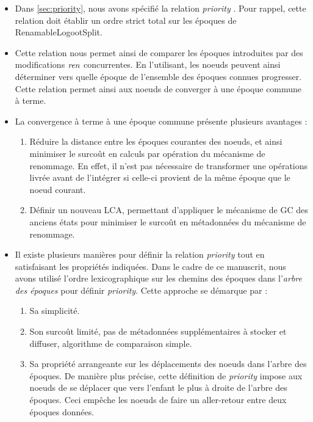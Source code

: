 \begin{itemize}
    \item Dans \autoref{sec:priority}, nous avons spécifié la relation \emph{priority} .
        Pour rappel, cette relation doit établir un ordre strict total sur les époques de RenamableLogootSplit.
    \item Cette relation nous permet ainsi de comparer les époques introduites par des modifications $\mathit{ren}$ concurrentes.
        En l'utilisant, les noeuds peuvent ainsi déterminer vers quelle époque de l'ensemble des époques connues progresser.
        Cette relation permet ainsi aux noeuds de converger à une époque commune à terme.
    \item La convergence à terme à une époque commune présente plusieurs avantages :
        \begin{enumerate}
            \item Réduire la distance entre les époques courantes des noeuds, et ainsi minimiser le surcoût en calculs par opération du mécanisme de renommage.
                En effet, il n'est pas nécessaire de transformer une opérations livrée avant de l'intégrer si celle-ci provient de la même époque que le noeud courant.
            \item Définir un nouveau \ac{LCA}, permettant d'appliquer le mécanisme de \ac{GC} des anciens états pour minimiser le surcoût en métadonnées du mécanisme de renommage.
        \end{enumerate}
    \item Il existe plusieurs manières pour définir la relation \emph{priority} tout en satisfaisant les propriétés indiquées.
        Dans le cadre de ce manuscrit, nous avons utilisé l'ordre lexicographique sur les chemins des époques dans l'\emph{arbre des époques} pour définir \emph{priority}.
        Cette approche se démarque par :
        \begin{enumerate}
            \item Sa simplicité.
            \item Son surcoût limité, \ie pas de métadonnées supplémentaires à stocker et diffuser, algorithme de comparaison simple.
            \item Sa propriété arrangeante sur les déplacements des noeuds dans l'arbre des époques.
                De manière plus précise, cette définition de \emph{priority} impose aux noeuds de se déplacer que vers l'enfant le plus à droite de l'arbre des époques.
                Ceci empêche les noeuds de faire un aller-retour entre deux époques données.

\end{enumerate}
\end{itemize}
